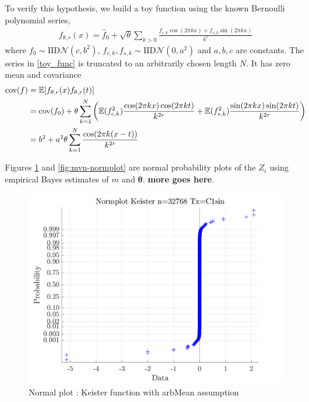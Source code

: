 \documentclass{svjour3}                     %
\newcommand{\bm}[1]{\boldsymbol{#1}}
\newcommand{\Ex}{\mathbb{E}}
\newcommand{\vtheta}{{\bm{\theta}}}
\newcommand{\cov}{{\textup{cov}}}
\newcommand{\calN}{\mathcal{N}}
\begin{document}
To verify this hypothesis, we build a toy function using the known Bernoulli polynomial series,
\begin{align}
\label{toy_func}
f_{\theta, r}(x) = \hat{f}_0 + \sqrt{\theta} \sum_{k > 0}
\frac{f_{c,k} \cos(2\pi k x) + f_{s,k} \sin(2\pi k x)}{k^r}
\end{align}
where $f_0 \sim \text{IID} \calN(c, b^2) $, $f_{c,k}, f_{s,k} \sim \text{IID} \calN(0, a^2)$ and $a, b, c$ are constants. The series in \eqref{toy_func} is truncated to an arbitrarily chosen length $N$. It has zero mean and covariance
\begin{align*}
\cov(f) &= \Ex[f_{\theta, r}(x) f_{\theta, r}(t)] \\
&= \cov(f_0) + \theta \sum_{k=1}^N 
\left(	
\Ex(f_{c,k}^2) \frac{\cos(2\pi k x) \cos(2\pi k t)}{k^{2r}} +
\Ex(f_{s,k}^2) \frac{\sin(2\pi k x) \sin(2\pi k t)}{k^{2r}} \right) \\
&= b^2 + a^2 \theta \sum_{k=1}^N 	
\frac{\cos(2\pi k (x - t)) }{k^{2r}} 
\end{align*}



Figures \ref{fig:keister-normplot} and \ref{fig:mvn-normplot} are normal probability plots of the $Z_i$ using empirical Bayes estimates of $m$ and $\vtheta$. \textbf{more goes here}.




\iftrue
\begin{figure}[ht]
	\centering
	\includegraphics[width=0.9\linewidth]{"figures/Keister Normplot d_2 bernoulli_2 Period_C1sin n_32768"}
	\caption{Normal plot : Keister function with arbMean assumption}
	\label{fig:keister-normplot}
\end{figure}
\end{document}
